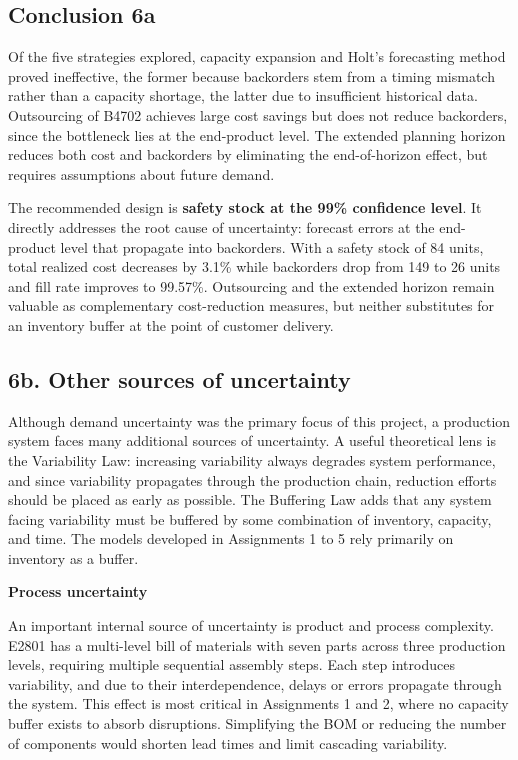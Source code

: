 \documentclass[a4paper,faculty=eb,language=en,doctype=article,sftitles=false]{ugent-doc}
\begin{document}
\subsection{Conclusion 6a}

Of the five strategies explored, capacity expansion and Holt's forecasting method proved ineffective, the former because backorders stem from a timing mismatch rather than a capacity shortage, the latter due to insufficient historical data. Outsourcing of B4702 achieves large cost savings but does not reduce backorders, since the bottleneck lies at the end-product level. The extended planning horizon reduces both cost and backorders by eliminating the end-of-horizon effect, but requires assumptions about future demand.
 
The recommended design is \textbf{safety stock at the 99\% confidence level}. It directly addresses the root cause of uncertainty: forecast errors at the end-product level that propagate into backorders. With a safety stock of 84 units, total realized cost decreases by 3.1\% while backorders drop from 149 to 26 units and fill rate improves to 99.57\%. Outsourcing and the extended horizon remain valuable as complementary cost-reduction measures, but neither substitutes for an inventory buffer at the point of customer delivery.

\subsection{6b. Other sources of uncertainty}

Although demand uncertainty was the primary focus of this project, a production system faces many additional sources of uncertainty. A useful theoretical lens is the Variability Law: increasing variability always degrades system performance, and since variability propagates through the production chain, reduction efforts should be placed as early as possible. The Buffering Law adds that any system facing variability must be buffered by some combination of inventory, capacity, and time. The models developed in Assignments 1 to 5 rely primarily on inventory as a buffer.

\vspace{0.5em}
\textbf{Process uncertainty}

An important internal source of uncertainty is product and process complexity. E2801 has a multi-level bill of materials with seven parts across three production levels, requiring multiple sequential assembly steps. Each step introduces variability, and due to their interdependence, delays or errors propagate through the system. This effect is most critical in Assignments 1 and 2, where no capacity buffer exists to absorb disruptions. Simplifying the BOM or reducing the number of components would shorten lead times and limit cascading variability.
\end{document}

